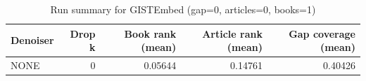 \begin{table}
\caption{Run summary for GISTEmbed (gap=0, articles=0, books=1)}
\label{tab:summary_gap0_gistembed_a0_b1}
\begin{tabular}{lrrrr}
\toprule
Denoiser & Drop k & Book rank (mean) & Article rank (mean) & Gap coverage (mean) \\
\midrule
NONE & 0 & 0.05644 & 0.14761 & 0.40426 \\
\bottomrule
\end{tabular}
\end{table}